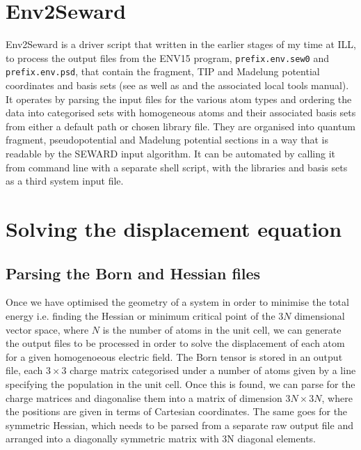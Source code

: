 \documentclass[10pt]{article}
\begin{document}
\section{Env2Seward}
Env2Seward is a driver script that written in the earlier stages of my time at ILL, to process the output files from the ENV15 program, \texttt{prefix.env.sew0} and \texttt{prefix.env.psd}, that contain the fragment, TIP and Madelung potential coordinates and basis sets (see \cite{varignon2013ab} as well as \cite{gelle2008fast} and the associated local tools manual). It operates by parsing the input files for the various atom types and ordering the data into categorised sets with homogeneous atoms and their associated basis sets from either a default path or chosen library file. They are organised into quantum fragment, pseudopotential and Madelung potential sections in a way that is readable by the SEWARD input algorithm. It can be automated by calling it from command line with a separate shell script, with the libraries and basis sets as a third system input file. 

\section{Solving the displacement equation}
\subsection{Parsing the Born and Hessian files}

Once we have optimised the geometry of a system in order to minimise the total energy i.e. finding the Hessian or minimum critical point of the $3N$ dimensional vector space, where $N$ is the number of atoms in the unit cell, we can generate the output files to be processed in order to solve the displacement of each atom for a given homogenoeous electric field.
The Born tensor is stored in an output file, each $3\times3$ charge matrix categorised under a number of atoms given by a line specifying the population in the unit cell. Once this is found, we can parse for the charge matrices and diagonalise them into a matrix of dimension $3N\times3N$, where the positions are given in terms of Cartesian coordinates. The same goes for the symmetric Hessian, which needs to be parsed from a separate raw output file and arranged into a diagonally symmetric matrix with 3N diagonal elements.
\end{document}
